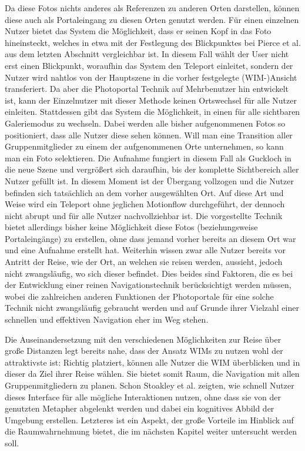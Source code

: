 Da diese Fotos nichts anderes als Referenzen zu anderen Orten darstellen, können diese auch als Portaleingang zu diesen Orten genutzt werden.
Für einen einzelnen Nutzer bietet das System die Möglichkeit, dass er seinen Kopf in das Foto \glqq hineinsteckt\grqq{}, welches in etwa mit der Festlegung des Blickpunktes bei Pierce et al. aus dem letzten Abschnitt vergleichbar ist. In diesem Fall wählt der User nicht erst einen Blickpunkt, woraufhin das System den Teleport einleitet, sondern der Nutzer wird nahtlos von der Hauptszene in die vorher festgelegte (WIM-)Ansicht transferiert. Da aber die Photoportal Technik auf Mehrbenutzer hin entwickelt ist, kann der Einzelnutzer mit dieser Methode keinen Ortswechsel für alle Nutzer einleiten. Stattdessen gibt das System die Möglichkeit, in einen für alle sichtbaren Galeriemodus zu wechseln. Dabei werden alle bisher aufgenommenen Fotos so positioniert, dass alle Nutzer diese sehen können. Will man eine Transition aller Gruppenmitglieder zu einem der aufgenommenen Orte unternehmen, so kann man ein Foto selektieren. Die Aufnahme fungiert in diesem Fall als \glqq Guckloch\grqq{} in die neue Szene und vergrößert sich daraufhin, bis der komplette Sichtbereich aller Nutzer gefüllt ist. In diesem Moment ist der Übergang vollzogen und die Nutzer befinden sich tatsächlich an dem vorher ausgewählten Ort. 
Auf diese Art und Weise wird ein Teleport ohne jeglichen Motionflow durchgeführt, der dennoch nicht abrupt und für alle Nutzer nachvollziehbar ist.
Die vorgestellte Technik bietet allerdings bisher keine Möglichkeit diese Fotos (beziehungsweise Portaleingänge) zu erstellen, ohne dass jemand vorher bereits an diesem Ort war und eine Aufnahme erstellt hat. Weiterhin wissen zwar alle Nutzer bereits vor Antritt der Reise, wie der Ort, an welchen sie reisen werden, aussieht, jedoch nicht zwangsläufig, wo sich dieser befindet.
Dies beides sind Faktoren, die es bei der Entwicklung einer reinen Navigationstechnik berücksichtigt werden müssen, wobei die zahlreichen anderen Funktionen der Photoportale für eine solche Technik nicht zwangsläufig gebraucht werden und auf Grunde ihrer Vielzahl einer schnellen und effektiven Navigation eher im Weg stehen.

Die Auseinandersetzung mit den verschiedenen Möglichkeiten zur Reise über große Distanzen legt bereits nahe, dass der Ansatz WIMs zu nutzen wohl der attraktivste ist:
Richtig platziert, können alle Nutzer die WIM überblicken und in dieser da Ziel ihrer Reise wählen. Sie bietet somit Raum, die Navigation mit allen Gruppenmitgliedern zu planen. Schon Stoakley et al. zeigten, wie schnell Nutzer dieses Interface für alle mögliche Interaktionen nutzen, ohne dass sie von der genutzten Metapher abgelenkt werden und dabei ein kognitives Abbild der Umgebung erstellen. 
Letzteres ist ein Aspekt, der große Vorteile im Hinblick auf die Raumwahrnehmung bietet, die im nächsten Kapitel weiter untersucht werden soll.
